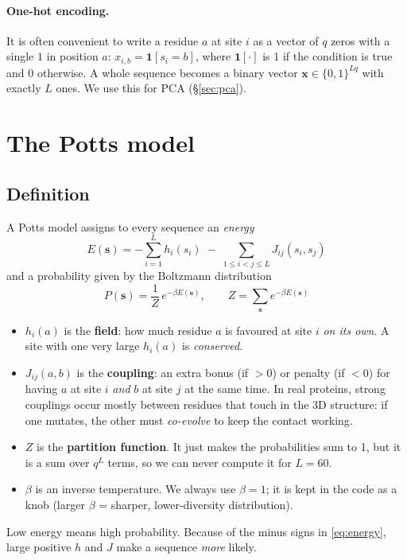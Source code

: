 \documentclass[11pt,a4paper]{article}
\newcommand{\s}{\bm{s}}
\newcommand{\one}{\mathbf{1}}
\begin{document}
\paragraph{One-hot encoding.} It is often convenient to write a residue $a$ at site $i$ as a vector
of $q$ zeros with a single $1$ in position $a$: $x_{i,b}=\one[s_i=b]$, where $\one[\cdot]$ is 1 if
the condition is true and 0 otherwise. A whole sequence becomes a binary vector
$\bm{x}\in\{0,1\}^{Lq}$ with exactly $L$ ones. We use this for PCA (\S\ref{sec:pca}).

\section{The Potts model}\label{sec:potts}
\subsection{Definition}
A Potts model assigns to every sequence an \emph{energy}
\begin{equation}\label{eq:energy}
  \boxed{\;E(\s) = -\sum_{i=1}^{L} h_i(s_i) \;-\; \sum_{1\le i<j\le L} J_{ij}(s_i,s_j)\;}
\end{equation}
and a probability given by the Boltzmann distribution
\begin{equation}\label{eq:boltz}
  \boxed{\;P(\s) = \frac{1}{Z}\,e^{-\beta E(\s)},\qquad Z=\sum_{\s} e^{-\beta E(\s)}\;}
\end{equation}
\begin{itemize}[nosep]
  \item $h_i(a)$ is the \textbf{field}: how much residue $a$ is favoured at site $i$ \emph{on its own}.
        A site with one very large $h_i(a)$ is \emph{conserved}.
  \item $J_{ij}(a,b)$ is the \textbf{coupling}: an extra bonus (if $>0$) or penalty (if $<0$) for having
        $a$ at site $i$ \emph{and} $b$ at site $j$ at the same time. In real proteins, strong couplings
        occur mostly between residues that touch in the 3D structure: if one mutates, the other
        must \emph{co-evolve} to keep the contact working.
  \item $Z$ is the \textbf{partition function}. It just makes the probabilities sum to 1, but it is a sum
        over $q^L$ terms, so we can never compute it for $L=60$.
  \item $\beta$ is an inverse temperature. We always use $\beta=1$; it is kept in the code as a knob
        (larger $\beta$ = sharper, lower-diversity distribution).
\end{itemize}
Low energy means high probability. Because of the minus signs in \eqref{eq:energy}, large positive
$h$ and $J$ make a sequence \emph{more} likely.
\end{document}
